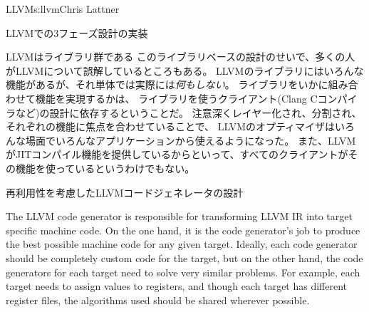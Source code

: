 \begin{aosachapter}{LLVM}{s:llvm}{Chris Lattner}
\begin{aosasect1}{LLVMでの3フェーズ設計の実装}
\begin{aosasect2}{LLVMはライブラリ群である}
このライブラリベースの設計のせいで、多くの人がLLVMについて誤解しているところもある。
LLVMのライブラリにはいろんな機能があるが、それ単体では実際には\emph{何もしない}。
ライブラリをいかに組み合わせて機能を実現するかは、
ライブラリを使うクライアント(Clang Cコンパイラなど)の設計に依存するということだ。
注意深くレイヤー化され、分割され、それぞれの機能に焦点を合わせていることで、
LLVMのオプティマイザはいろんな場面でいろんなアプリケーションから使えるようになった。
また、LLVMがJITコンパイル機能を提供しているからといって、すべてのクライアントがその機能を使っているというわけでもない。

\end{aosasect2}

\end{aosasect1}

\begin{aosasect1}{再利用性を考慮したLLVMコードジェネレータの設計}

The LLVM code generator is responsible for transforming LLVM IR into
target specific machine code.  On the one hand, it is the code
generator's job to produce the best possible machine code for any
given target.  Ideally, each code generator should be completely
custom code for the target, but on the other hand, the code generators
for each target need to solve very similar problems.  For example,
each target needs to assign values to registers, and though each
target has different register files, the algorithms used should be
shared wherever possible.


\end{aosasect1}
\end{aosachapter}
